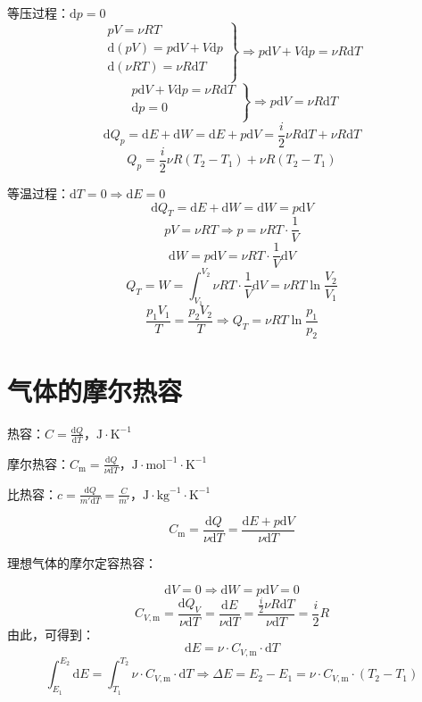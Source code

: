 \documentclass[12pt, a4paper, twoside]{ctexbook}
\begin{document}
{\sonti 等压过程}：$\mathrm{d}p=0$
$$
\left. \begin{array}{r}
	pV=\nu RT\\
	\mathrm{d}\left( pV \right) =p\mathrm{d}V+V\mathrm{d}p\\
	\mathrm{d}\left( \nu RT \right) =\nu R\mathrm{d}T\\
\end{array} \right\} \Rightarrow p\mathrm{d}V+V\mathrm{d}p=\nu R\mathrm{d}T
$$
$$
\left. \begin{array}{r}
	p\mathrm{d}V+V\mathrm{d}p=\nu R\mathrm{d}T\\
	\mathrm{d}p=0\\
\end{array} \right\} \Rightarrow p\mathrm{d}V=\nu R\mathrm{d}T
$$
$$
\mathrm{d}Q_p=\mathrm{d}E+\mathrm{d}W=\mathrm{d}E+p\mathrm{d}V=\frac{i}{2}\nu R\mathrm{d}T + \nu R\mathrm{d}T
$$
$$
Q_p=\frac{i}{2}\nu R(T_2-T_1)+\nu R(T_2-T_1)
$$

{\sonti 等温过程}：$\mathrm{d}T=0 \Rightarrow \mathrm{d}E=0$
$$
\mathrm{d}Q_T=\mathrm{d}E+\mathrm{d}W=\mathrm{d}W=p\mathrm{d}V
$$
$$
pV=\nu RT \Rightarrow p=\nu RT\cdot \frac{1}{V}
$$
$$
\mathrm{d}W=p\mathrm{d}V=\nu RT\cdot \frac{1}{V}\mathrm{d}V
$$
$$
Q_T=W=\int_{V_1}^{V_2} \nu RT\cdot \frac{1}{V}\mathrm{d}V =\nu RT\ln \frac{V_2}{V_1}
$$
$$
\frac{p_1V_1}{T}=\frac{p_2V_2}{T} \Rightarrow Q_T=\nu RT\ln \frac{p_1}{p_2}
$$
\section{气体的摩尔热容}
{\sonti 热容}：$C=\frac{\mathrm{d}Q}{\mathrm{d}T}$，$\mathrm{J}\cdot\mathrm{K}^{-1}$

{\sonti 摩尔热容}：$C_\mathrm{m}=\frac{\mathrm{d}Q}{\nu \mathrm{d}T}$，$\mathrm{J}\cdot\mathrm{mol}^{-1}\cdot\mathrm{K}^{-1}$

{\sonti 比热容}：$c=\frac{\mathrm{d}Q}{m'\mathrm{d}T}=\frac{C}{m'}$，$\mathrm{J}\cdot\mathrm{kg}^{-1}\cdot\mathrm{K}^{-1}$

$$
C_\mathrm{m}=\frac{\mathrm{d}Q}{\nu \mathrm{d}T}=\frac{\mathrm{d}E+p\mathrm{d}V}{\nu\mathrm{d}T}
$$

{\sonti 理想气体的摩尔定容热容}：

$$
\mathrm{d}V=0 \Rightarrow \mathrm{d}W=p\mathrm{d}V=0
$$
$$
C_{V,\mathrm{m}}=\frac{\mathrm{d}Q_V}{\nu \mathrm{d}T}=\frac{\mathrm{d}E}{\nu\mathrm{d}T}=\frac{\frac{i}{2}\nu R\mathrm{d}T}{\nu\mathrm{d}T}=\frac{i}{2}R
$$
由此，可得到：
$$
\mathrm{d}E=\nu\cdot C_{V,\mathrm{m}}\cdot \mathrm{d}T
$$
$$
\int_{E_1}^{E_2}\mathrm{d}E=\int_{T_1}^{T_2}\nu\cdot C_{V,\mathrm{m}}\cdot \mathrm{d}T \Rightarrow \Delta E=E_2-E_1=\nu\cdot C_{V,\mathrm{m}}\cdot\left(T_2-T_1\right)
$$
\end{document}
